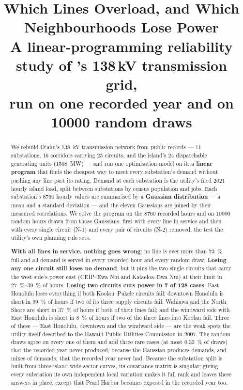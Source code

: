 \documentclass[11pt,a4paper]{article}
\title{\bfseries Which Lines Overload, and Which Neighbourhoods Lose Power\\[4pt]
\large A linear-programming reliability study of \Oahu's 138\,kV transmission grid,\\
run on one recorded year and on \num{10000} random draws}
\author{}
\date{}
\newcommand{\okina}{\textquoteleft}
\newcommand{\Oahu}{O\okina ahu}
\begin{document}
\maketitle
\vspace{-2.2em}

\begin{abstract}
\noindent
We rebuild \Oahu's \SI{138}{kV} transmission network from public records --- 11
substations, 16 corridors carrying 25 circuits, and the island's 24 dispatchable
generating units (\SI{1508}{MW}) --- and run one optimisation model on it: a
\textbf{linear program} that finds the cheapest way to meet every substation's demand
without pushing any line past its rating. Demand at each substation is the utility's
filed 2021 hourly island load, split between substations by census population and
jobs. Each substation's \num{8760} hourly values are summarised by a
\textbf{Gaussian distribution} --- a mean and a standard deviation --- and the eleven
Gaussians are joined by their measured correlations. We solve the program on the
\num{8760} recorded hours and on \num{10000} random hours drawn from those Gaussians,
first with every line in service and then with every single circuit (N-1) and every
pair of circuits (N-2) removed, the test the utility's own planning rule sets.

\textbf{With all lines in service, nothing goes wrong}: no line is ever more than
\SI{73}{\percent} full and all demand is served in every recorded hour and every random
draw. \textbf{Losing any one circuit still loses no demand}, but it pins the two
single circuits that carry the west side's power east (CEIP--Ewa Nui and
Kalaeloa--Ewa Nui) at their limit in \SIrange{27}{39}{\percent} of hours.
\textbf{Losing two circuits cuts power in 7 of 128 cases}: East Honolulu loses
everything if both Koolau--Pukele circuits fail; downtown Honolulu is short in
\SI{99}{\percent} of hours if two of its three supply circuits fail; Wahiaw\=a and the
North Shore are short in \SI{37}{\percent} of hours if both of their lines fail; and
the windward side with East Honolulu is short in \SI{8}{\percent} of hours if two of
the three lines into Koolau fail. Three of these --- East Honolulu, downtown and the
windward side --- are the weak spots the utility itself described to the Hawai\okina i
Public Utilities Commission in 2007. The random draws agree on every one of them and add
three rare cases (at most \SI{0.33}{\percent} of draws) that the recorded year never
produced, because the Gaussian produces demands, and mixes of demands, that the
recorded year never had. Because the substation split is built from three island-wide
sector curves, its covariance matrix is singular; giving every substation its own
independent local variation makes it full rank and leaves these answers in place,
except that Pearl Harbor becomes exposed in the recorded year too.
\end{abstract}
\end{document}
